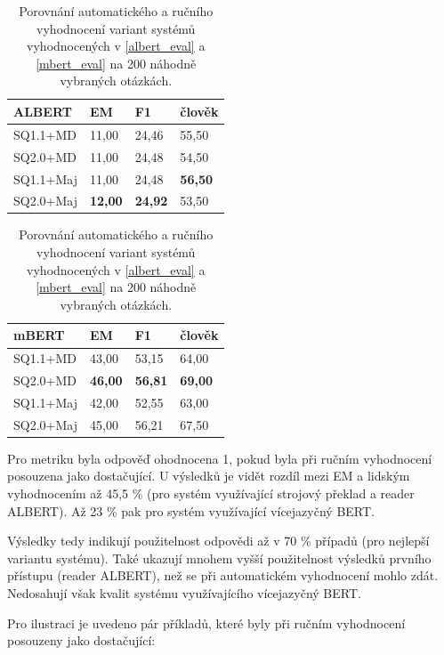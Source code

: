 \begin{table}[H]
\centering
\begin{tabular}{|l||l|l|l|}
    \hline
        {ALBERT}       & \textbf{EM} & \textbf{F1} & \textbf{člověk} \\ \hline\hline
    SQ1.1+MD  & 11,00       & 24,46       & 55,50               \\ \hline
    SQ2.0+MD  & 11,00       & 24,48       & 54,50               \\ \hline
    SQ1.1+Maj & 11,00       & 24,48      & \textbf{56,50}               \\ \hline
    SQ2.0+Maj & \textbf{12,00}       & \textbf{24,92}      & 53,50               \\ \hline
    \end{tabular}
    \begin{tabular}{|l||l|l|l|}
    \hline
    {mBERT}       & \textbf{EM} & \textbf{F1} & \textbf{člověk} \\ \hline\hline
    SQ1.1+MD  & 43,00       & 53,15         & 64,00               \\ \hline
    SQ2.0+MD  & \textbf{46,00}& \textbf{56,81}& \textbf{69,00}              \\ \hline
    SQ1.1+Maj & 42,00       & 52,55           & 63,00               \\ \hline
    SQ2.0+Maj & 45,00       & 56,21           & 67,50               \\ \hline
    \end{tabular}
\caption{Porovnání automatického a ručního vyhodnocení variant systémů vyhodnocených v \ref{albert_eval} a \ref{mbert_eval} na 200 náhodně vybraných otázkách.}
\label{tab:human_eval}
\end{table}

Pro metriku  byla odpověď ohodnocena 1, pokud byla při ručním vyhodnocení posouzena jako dostačující. U výsledků je vidět rozdíl mezi EM a lidským vyhodnocením až 45,5 \% (pro systém využívající strojový překlad a reader ALBERT). Až 23 \% pak pro systém využívající vícejazyčný BERT.\par
Výsledky tedy indikují použitelnost odpovědi až v 70 \% případů (pro nejlepší variantu systému). Také ukazují mnohem vyšší použitelnost výsledků prvního přístupu (reader ALBERT), než se při automatickém vyhodnocení mohlo zdát. Nedosahují však kvalit systému využívajícího vícejazyčný BERT.\par
Pro ilustraci je uvedeno pár příkladů, které byly při ručním vyhodnocení posouzeny jako dostačující:

